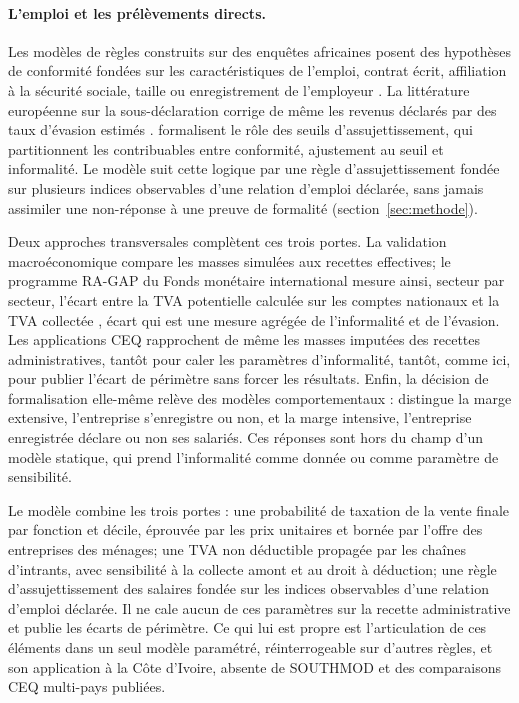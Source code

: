 \documentclass[11pt,a4paper]{article}
\begin{document}
\paragraph{L'emploi et les prélèvements directs.} Les modèles de règles
construits sur des enquêtes africaines posent des hypothèses de conformité
fondées sur les caractéristiques de l'emploi, contrat écrit, affiliation à la
sécurité sociale, taille ou enregistrement de l'employeur
\citep{decoster2019,gasior2018}. La littérature européenne sur la
sous-déclaration corrige de même les revenus déclarés par des taux d'évasion
estimés \citep{matsaganis2010}. \citet{kanburkeen2014} formalisent le rôle des
seuils d'assujettissement, qui partitionnent les contribuables entre
conformité, ajustement au seuil et informalité. Le modèle suit cette logique
par une règle d'assujettissement fondée sur plusieurs indices observables d'une
relation d'emploi déclarée, sans jamais assimiler une non-réponse à une preuve
de formalité (section~\ref{sec:methode}).

Deux approches transversales complètent ces trois portes. La validation
macroéconomique compare les masses simulées aux recettes effectives; le
programme RA-GAP du Fonds monétaire international mesure ainsi, secteur par
secteur, l'écart entre la TVA potentielle calculée sur les comptes nationaux et
la TVA collectée \citep{hutton2017}, écart qui est une mesure agrégée de
l'informalité et de l'évasion. Les applications CEQ rapprochent de même les
masses imputées des recettes administratives, tantôt pour caler les paramètres
d'informalité, tantôt, comme ici, pour publier l'écart de périmètre sans forcer
les résultats. Enfin, la décision de formalisation elle-même relève des modèles
comportementaux : \citet{ulyssea2018} distingue la marge extensive, l'entreprise
s'enregistre ou non, et la marge intensive, l'entreprise enregistrée déclare ou
non ses salariés. Ces réponses sont hors du champ d'un modèle statique, qui
prend l'informalité comme donnée ou comme paramètre de sensibilité.

Le modèle combine les trois portes : une probabilité de
taxation de la vente finale par fonction et décile, éprouvée par les prix
unitaires et bornée par l'offre des entreprises des ménages; une TVA non
déductible propagée par les chaînes d'intrants, avec sensibilité à la collecte
amont et au droit à déduction; une règle d'assujettissement des salaires fondée
sur les indices observables d'une relation d'emploi déclarée. Il ne cale aucun
de ces paramètres sur la recette administrative et publie les écarts de
périmètre. Ce qui lui est propre est l'articulation de ces éléments dans un
seul modèle paramétré, réinterrogeable sur d'autres règles, et son application
à la Côte d'Ivoire, absente de SOUTHMOD et des comparaisons CEQ multi-pays
publiées.
\end{document}

